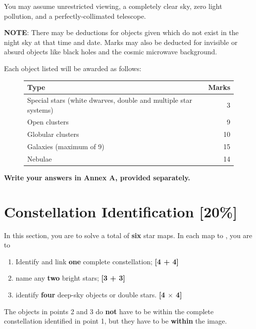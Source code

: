 \documentclass[a4paper,11pt]{exam}
\begin{document}
You may assume unrestricted viewing, a completely clear sky, zero light pollution, and a perfectly-collimated telescope.

\textbf{NOTE}: There may be deductions for objects given which do not exist in the night sky at that time and date. Marks may also be deducted for invisible or absurd objects like black holes and the cosmic microwave background. 

Each object listed will be awarded as follows:
\begin{figure}[H]
	\centering
	\begin{tabularx}{0.7\linewidth}{@{}Xr@{}}
		\toprule
		\textbf{Type} & \textbf{Marks} \\ \midrule
		Special stars (white dwarves, double and multiple star systems) & 3 \\
		Open clusters &  9 \\
		Globular clusters & 10 \\
		Galaxies (maximum of 9) & 15 \\
		Nebulae & 14 \\
		\bottomrule
	\end{tabularx}
\end{figure}

\textbf{Write your answers in Annex A, provided separately.}

\newpage
\section{Constellation Identification \hfill [20\%]}
In this section, you are to solve a total of \textbf{six} star maps. In each map  to , you are to
\begin{enumerate}[leftmargin=12pt]
	\item Identify  and link \textbf{one} complete constellation; \hfill \textbf{[4 + 4]}
	\item name any \textbf{two} bright stars; \hfill \textbf{[3 + 3]}
	\item identify \textbf{four} deep-sky objects or double stars. \hfill \textbf{[4 $ \times $ 4]}
\end{enumerate}

The objects in points 2 and 3 do \textbf{not} have to be within the complete constellation identified in point 1, but they have to be \textbf{within} the image.

{}
\end{document}
